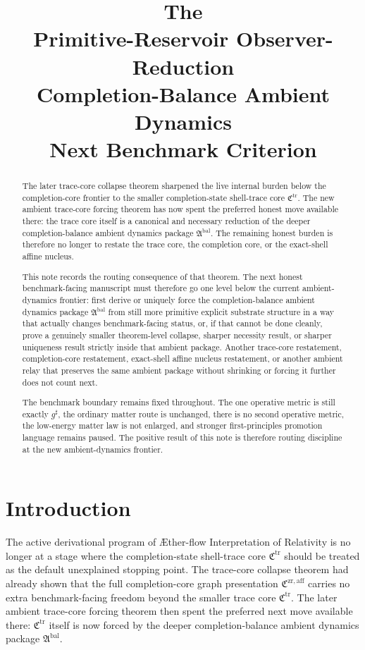 \documentclass[11pt]{article}
\title{\textbf{The \TheoryName{}}\\[0.4em]
\large Primitive-Reservoir Observer-Reduction\\
\large Completion-Balance Ambient Dynamics\\
\large Next Benchmark Criterion}
\author{}
\date{}
\newcommand{\Aflow}{\AE{}ther-flow}
\newcommand{\TheoryName}{\Aflow{} Interpretation of Relativity}
\newcommand{\CompletedMetric}{g^{\sharp}}
\newcommand{\CompletionCore}{\mathfrak C^{\mathrm{zr,aff}}}
\newcommand{\TraceCore}{\mathfrak C^{\mathrm{tr}}}
\newcommand{\AmbientPackage}{\mathfrak A^{\mathrm{bal}}}
\begin{document}
\maketitle

\begin{abstract}
The later trace-core collapse theorem sharpened the live internal burden below the completion-core frontier to the smaller completion-state shell-trace core \(\TraceCore\). The new ambient trace-core forcing theorem has now spent the preferred honest move available there: the trace core itself is a canonical and necessary reduction of the deeper completion-balance ambient dynamics package \(\AmbientPackage\). The remaining honest burden is therefore no longer to restate the trace core, the completion core, or the exact-shell affine nucleus.

This note records the routing consequence of that theorem. The next honest benchmark-facing manuscript must therefore go one level below the current ambient-dynamics frontier: first derive or uniquely force the completion-balance ambient dynamics package \(\AmbientPackage\) from still more primitive explicit substrate structure in a way that actually changes benchmark-facing status, or, if that cannot be done cleanly, prove a genuinely smaller theorem-level collapse, sharper necessity result, or sharper uniqueness result strictly inside that ambient package. Another trace-core restatement, completion-core restatement, exact-shell affine nucleus restatement, or another ambient relay that preserves the same ambient package without shrinking or forcing it further does not count next.

The benchmark boundary remains fixed throughout. The one operative metric is still exactly \(\CompletedMetric\), the ordinary matter route is unchanged, there is no second operative metric, the low-energy matter law is not enlarged, and stronger first-principles promotion language remains paused. The positive result of this note is therefore routing discipline at the new ambient-dynamics frontier.
\end{abstract}

\section{Introduction}

The active derivational program of \TheoryName{} is no longer at a stage where the completion-state shell-trace core \(\TraceCore\) should be treated as the default unexplained stopping point. The trace-core collapse theorem had already shown that the full completion-core graph presentation \(\CompletionCore\) carries no extra benchmark-facing freedom beyond the smaller trace core \(\TraceCore\). The later ambient trace-core forcing theorem then spent the preferred next move available there: \(\TraceCore\) itself is now forced by the deeper completion-balance ambient dynamics package \(\AmbientPackage\).
\end{document}
